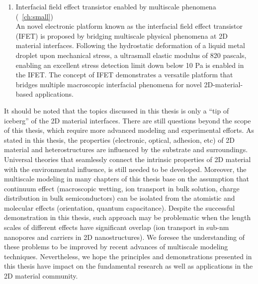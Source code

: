 \begin{enumerate}
\item Interfacial field effect transistor enabled by multiscale phenomena (~\autoref{ch:small})\\
  An novel electronic platform known as the interfacial field effect
  transistor (IFET) is proposed by bridging multiscale physical
  phenomena at 2D material interfaces. Following the hydrostatic
  deformation of a liquid metal droplet upon mechanical stress, a
  ultrasmall elastic modulus of 820 pascals, enabling an
  excellent stress detection limit down below 10 Pa is enabled in the
  IFET. The concept of IFET demonstrates a versatile platform that
  bridges multiple macroscopic interfacial phenomena for novel
  2D-material-based applications.
\end{enumerate}

It should be noted that the topics discussed in this thesis is only a
``tip of iceberg'' of the 2D material interfaces. There are still
questions beyond the scope of this thesis, which require more advanced
modeling and experimental efforts.
% 
As stated in this thesis, the properties (electronic, optical,
adhesion, etc) of 2D material and heterostructures are influenced by
the substrate and surroundings. Universal theories that seamlessly
connect the intrinsic properties of 2D material with the environmental
influence, is still needed to be developed. Moreover, the multiscale
modeling in many chapters of this thesis base on the assumption that
continuum effect (\eg macroscopic wetting, ion transport in bulk
solution, charge distribution in bulk semiconductors) can be isolated
from the atomistic and molecular effects (\eg orientation, quantum
capacitance). Despite the successful demonstration in this thesis,
such approach may be problematic when the length scales of different
effects have significant overlap (\eg ion transport in sub-nm
nanopores and carriers in 2D nano\-structures). We foresee the
understanding of these problems to be improved by recent advances of
multiscale modeling techniques.  Nevertheless, we hope the principles
and demonstrations presented in this thesis have impact on the
fundamental research as well as applications in the 2D material
community.


